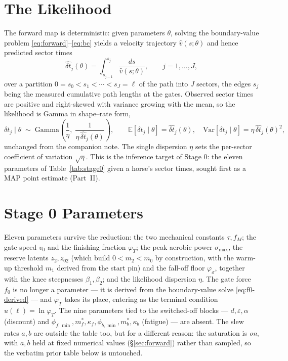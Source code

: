 \documentclass[11pt]{article}
\newcommand{\dt}{\widehat{\delta t}}
\begin{document}
\section{The Likelihood}

The forward map is deterministic: given parameters $\theta$, solving the boundary-value problem \eqref{eq:forward}--\eqref{eq:bc} yields a velocity trajectory $\hat v(s; \theta)$ and hence predicted sector times
\begin{equation}\label{eq:sectortime}
\dt_j(\theta) = \int_{s_{j-1}}^{s_j} \frac{ds}{\hat v(s; \theta)}, \qquad j = 1, \dots, J,
\end{equation}
over a partition $0 = s_0 < s_1 < \cdots < s_J = \ell$ of the path into $J$ sectors, the edges $s_j$ being the measured cumulative path lengths at the gates. Observed sector times are positive and right-skewed with variance growing with the mean, so the likelihood is Gamma in shape--rate form,
\begin{equation}\label{eq:likelihood}
\delta t_j \mid \theta \;\sim\; \text{Gamma}\!\left(\frac{1}{\eta},\; \frac{1}{\eta\, \dt_j(\theta)}\right),
\qquad
\mathbb{E}[\delta t_j \mid \theta] = \dt_j(\theta), \quad
\mathrm{Var}[\delta t_j \mid \theta] = \eta\, \dt_j(\theta)^2,
\end{equation}
unchanged from the companion note. The single dispersion $\eta$ sets the per-sector coefficient of variation $\sqrt{\eta}$. This is the inference target of Stage 0: the eleven parameters of Table~\ref{tab:stage0} given a horse's sector times, sought first as a MAP point estimate (Part~II).

\section{Stage 0 Parameters}\label{sec:params}

Eleven parameters survive the reduction: the two mechanical constants $\tau, f_M$; the gate speed $v_0$ and the finishing fraction $\varphi_T$; the peak aerobic power $\sigma_{\max}$, the reserve latents $z_2, z_{02}$ (which build $0 < m_2 < m_0$ by construction, with the warm-up threshold $m_1$ derived from the start pin) and the fall-off floor $\varphi_\sigma$, together with the knee steepnesses $\beta_1, \beta_2$; and the likelihood dispersion $\eta$. The gate force $f_0$ is no longer a parameter --- it is derived from the boundary-value solve \eqref{eq:f0-derived} --- and $\varphi_T$ takes its place, entering as the terminal condition $u(\ell) = \ln\varphi_T$. The nine parameters tied to the switched-off blocks --- $d, \varepsilon, \alpha$ (discount) and $\phi_{f,\min}, m_f^*, \kappa_f, \phi_{b,\min}, m_b^*, \kappa_b$ (fatigue) --- are absent. The slew rates $a, b$ are outside the table too, but for a different reason: the saturation is \emph{on}, with $a, b$ held at fixed numerical values (\S\ref{sec:forward}) rather than sampled, so the verbatim prior table below is untouched.
\end{document}

